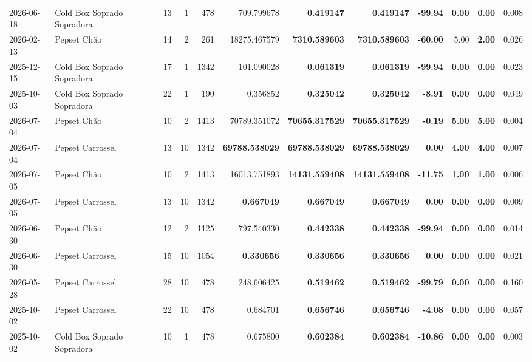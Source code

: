 {\begin{center}
{\begin{tabular}{@{}llrrrrrrrrrr@{}}
2026-06-18 & Cold Box Soprado Sopradora & 13 & 1 & 478 & 709.799678 & \textbf{0.419147} & \textbf{0.419147} & \textbf{-99.94} & \textbf{0.00} & \textbf{0.00} & 0.008 \\
2026-02-13 & Pepset Chão & 14 & 2 & 261 & 18275.467579 & \textbf{7310.589603} & \textbf{7310.589603} & \textbf{-60.00} & 5.00 & \textbf{2.00} & 0.026 \\
2025-12-15 & Cold Box Soprado Sopradora & 17 & 1 & 1342 & 101.090028 & \textbf{0.061319} & \textbf{0.061319} & \textbf{-99.94} & \textbf{0.00} & \textbf{0.00} & 0.023 \\
2025-10-03 & Cold Box Soprado Sopradora & 22 & 1 & 190 & 0.356852 & \textbf{0.325042} & \textbf{0.325042} & \textbf{-8.91} & \textbf{0.00} & \textbf{0.00} & 0.049 \\
2026-07-04 & Pepset Chão & 10 & 2 & 1413 & 70789.351072 & \textbf{70655.317529} & \textbf{70655.317529} & \textbf{-0.19} & \textbf{5.00} & \textbf{5.00} & 0.004 \\
2026-07-04 & Pepset Carrossel & 13 & 10 & 1342 & \textbf{69788.538029} & \textbf{69788.538029} & \textbf{69788.538029} & \textbf{0.00} & \textbf{4.00} & \textbf{4.00} & 0.007 \\
2026-07-05 & Pepset Chão & 10 & 2 & 1413 & 16013.751893 & \textbf{14131.559408} & \textbf{14131.559408} & \textbf{-11.75} & \textbf{1.00} & \textbf{1.00} & 0.006 \\
2026-07-05 & Pepset Carrossel & 13 & 10 & 1342 & \textbf{0.667049} & \textbf{0.667049} & \textbf{0.667049} & \textbf{0.00} & \textbf{0.00} & \textbf{0.00} & 0.009 \\
2026-06-30 & Pepset Chão & 12 & 2 & 1125 & 797.540330 & \textbf{0.442338} & \textbf{0.442338} & \textbf{-99.94} & \textbf{0.00} & \textbf{0.00} & 0.014 \\
2026-06-30 & Pepset Carrossel & 15 & 10 & 1054 & \textbf{0.330656} & \textbf{0.330656} & \textbf{0.330656} & \textbf{0.00} & \textbf{0.00} & \textbf{0.00} & 0.021 \\
2026-05-28 & Pepset Carrossel & 28 & 10 & 478 & 248.606425 & \textbf{0.519462} & \textbf{0.519462} & \textbf{-99.79} & \textbf{0.00} & \textbf{0.00} & 0.160 \\
2025-10-02 & Pepset Carrossel & 22 & 10 & 478 & 0.684701 & \textbf{0.656746} & \textbf{0.656746} & \textbf{-4.08} & \textbf{0.00} & \textbf{0.00} & 0.057 \\
2025-10-02 & Cold Box Soprado Sopradora & 10 & 1 & 478 & 0.675800 & \textbf{0.602384} & \textbf{0.602384} & \textbf{-10.86} & \textbf{0.00} & \textbf{0.00} & 0.003 \\

\end{tabular}}
\end{center}}
